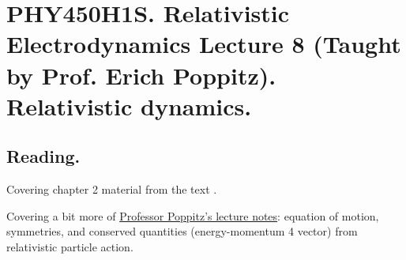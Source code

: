 
%

\chapter{PHY450H1S.  Relativistic Electrodynamics Lecture 8 (Taught by Prof. Erich Poppitz).  Relativistic dynamics.}
\label{chap:relativisticElectrodynamicsL8}
{}
\date{Feb 1, 2011}

\beginArtNoToc

\section{Reading.}

Covering chapter 2 material from the text \cite{landau1980classical}.

Covering a bit more of \href{http://www.physics.utoronto.ca/~poppitz/e-poppitz/PHY450_files/RelEMpp52-56.pdf}{Professor Poppitz's lecture notes}: equation of motion, symmetries, and conserved quantities (energy-momentum 4 vector) from relativistic particle action.

\EndArticle
